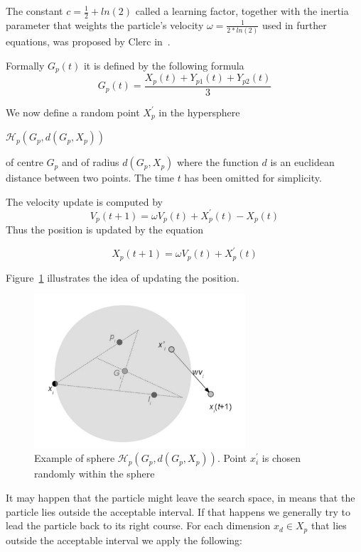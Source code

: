 \documentclass{book}
\begin{document}
The constant $c = \frac{1}{2} + ln(2)$ called a learning factor, together with the inertia parameter that weights the particle's velocity $\omega = \frac{1}{2 * ln(2)}$ used in further equations, was proposed by Clerc in~\cite{pso_anal}.

Formally $G_p(t)$ it is defined by the following formula 
\begin{equation}
G_p(t) = \frac{X_p(t) + Y_{p1}(t) + Y_{p2}(t)} {3}
\end{equation}

We now define a random point $X^{'}_p$ in the hypersphere
\begin{center}
    $\mathcal{H}_p(G_p, d(G_p, X_p))$ 
\end{center}
of centre $G_p$ and of radius $d(G_p, X_p)$ where the function $d$ is an euclidean distance between two points. The time $t$ has been omitted for simplicity.

The velocity update is computed by
\begin{equation}
V_p(t+1) = \omega  V_p(t) + X^{'}_p(t) - X_p(t)
\end{equation}
Thus the position is updated by the equation

\begin{equation}
X_p(t+1) = \omega  V_p(t) + X^{'}_p(t)
\end{equation}

Figure~\ref{fig:pso_sphere} illustrates the idea of updating the position.

\begin{figure}[H]
    \includegraphics[width=0.7\textwidth]{./images/pso_sphere.png}
    \caption{Example of sphere  $\mathcal{H}_p(G_p, d(G_p, X_p))$. Point $x^{'}_{i}$ is chosen randomly within the sphere}
    \label{fig:pso_sphere}
\end{figure}

It may happen that the particle might leave the search space, in means that the particle lies outside the acceptable interval. If that happens we generally try to lead the particle back to its right course. For each dimension $x_{d} \in X_p$ that lies  outside the acceptable interval we apply the following:
\end{document}
